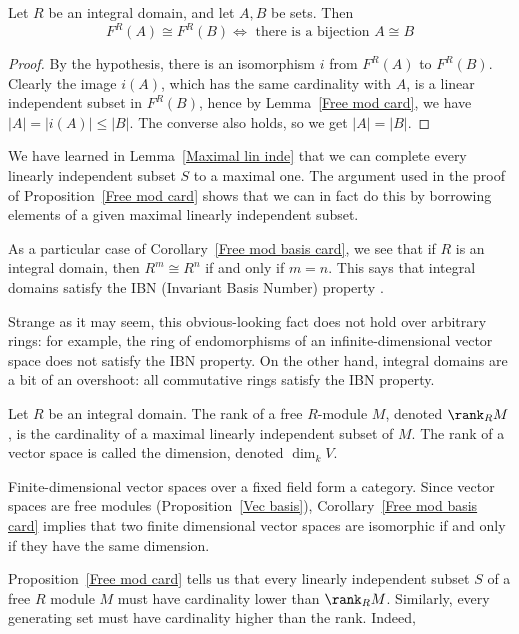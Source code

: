 \begin{corollary}\label{Free mod basis card}
Let $R$ be an integral domain, and let $A,B$ be sets. Then
\[F^R(A)\cong F^R(B)\iff\text{ there is a bijection }A\cong B\]
\end{corollary}
\begin{proof}
By the hypothesis, there is an isomorphism $i$ from $F^R(A)$ to $F^R(B)$. Clearly the image $i(A)$, which has the same cardinality with $A$, is a linear independent subset in $F^R(B)$, hence by Lemma~\ref{Free mod card}, we have $|A|=|i(A)|\leqslant |B|$. The converse also holds, so we get $|A|=|B|$.
\end{proof}
\begin{remark}
We have learned in Lemma~\ref{Maximal lin inde} that we can complete every linearly independent subset $S$ to a maximal one. The argument used in the proof of Proposition~\ref{Free mod card} shows that we can in fact do this by borrowing elements of a given maximal linearly independent subset.
\end{remark}
\begin{remark}
As a particular case of Corollary~\ref{Free mod basis card}, we see that if $R$ is an integral
domain, then $R^m\cong R^n$ if and only if $m=n$. This says that integral domains satisfy the IBN (Invariant Basis Number) property .
\end{remark}
\vspace{5mm}
Strange as it may seem, this obvious-looking fact does not hold over arbitrary rings: for example, the ring of endomorphisms of an infinite-dimensional vector space does not satisfy the IBN property. On the other hand, integral domains are a bit of an overshoot: all commutative rings satisfy the IBN property.
\vspace{5mm}
\begin{definition}
Let $R$ be an integral domain. The rank of a free $R$-module $M$, denoted $\rank_RM$, is the cardinality of a maximal linearly independent subset of $M$. The rank of a vector space is called the dimension, denoted $\dim_kV$.
\end{definition}
Finite-dimensional vector spaces over a fixed field form a category. Since vector spaces are free modules (Proposition~\ref{Vec basis}), Corollary~\ref{Free mod basis card} implies that two finite dimensional vector spaces are isomorphic if and only if they have the same dimension.\par
Proposition~\ref{Free mod card} tells us that every linearly independent subset $S$ of a free $R$ module $M$ must have cardinality lower than $\rank_RM$. Similarly, every generating set must have cardinality higher than the rank. Indeed,
